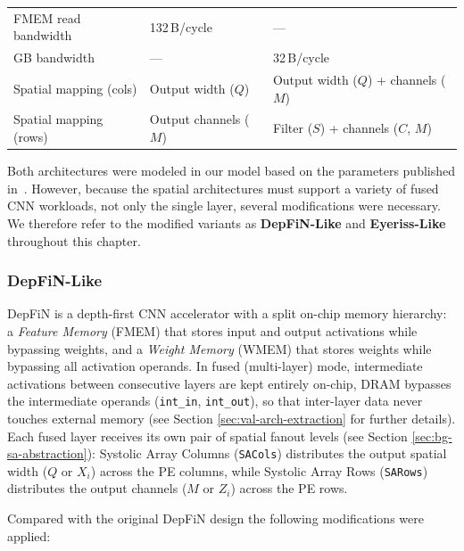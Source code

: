 \begin{table}[htbp]
\begin{tabular}{l l l}
    FMEM read bandwidth          & 132\,B/cycle                         & ---                                 \\
    GB bandwidth                 & ---                                  & 32\,B/cycle                         \\
    \addlinespace
    Spatial mapping (cols)       & Output width ($Q$)                   & Output width ($Q$) + channels ($M$) \\
    Spatial mapping (rows)       & Output channels ($M$)                & Filter ($S$) + channels ($C$, $M$)  \\
    \bottomrule
  \end{tabular}
\end{table}

Both architectures were modeled in our model based on the
parameters published in~\cite{goetschalckx2023depfin,eyeriss}.
However, because the spatial architectures must support a variety of fused CNN
workloads, not only the single layer, several modifications were necessary.
We therefore refer to the modified variants as \textbf{DepFiN-Like} and
\textbf{Eyeriss-Like} throughout this chapter.

\subsubsection{DepFiN-Like}
\label{sec:depfin-like}

DepFiN is a depth-first CNN accelerator with a split on-chip memory
hierarchy: a \emph{Feature Memory} (FMEM) that stores input and output
activations while bypassing weights, and a \emph{Weight Memory} (WMEM) that
stores weights while bypassing all activation operands.
In fused (multi-layer) mode, intermediate activations between consecutive
layers are kept entirely on-chip, DRAM bypasses the intermediate operands
(\texttt{int\_in}, \texttt{int\_out}), so that inter-layer data never touches external memory (see Section \ref{sec:val-arch-extraction} for further details).
Each fused layer receives its own pair of spatial fanout levels (see Section \ref{sec:bg-sa-abstraction}): Systolic Array Columns (\texttt{SACols}) distributes the output spatial width ($Q$ or $X_i$) across
the PE columns, while Systolic Array Rows (\texttt{SARows}) distributes the output channels
($M$ or $Z_i$) across the PE rows.

Compared with the original DepFiN design the following modifications were applied:

